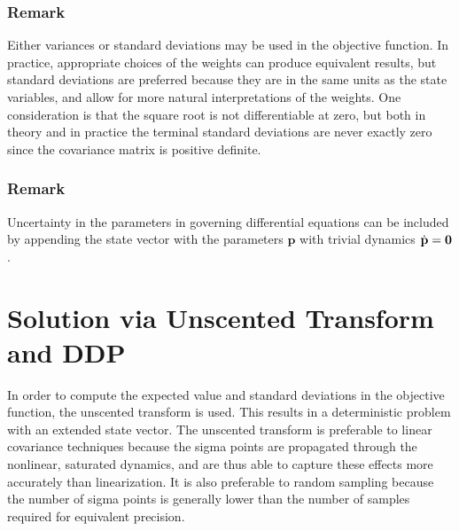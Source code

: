 \documentclass[journal ]{new-aiaa}
\newcommand{\state}{\ensuremath{\mathbf{x}}}
\newcommand{\ur}{\ensuremath{u_{\mathrm{ref}}}}
\newcommand{\param}{\ensuremath{\mathbf{p}}}
\newcommand{\E}[1]{\mathbb{E}\left[#1\right]}
\newcommand{\V}[1]{\mathbb{V}[#1]}
\newcommand{\cov}{C}
\begin{document}
\subsubsection*{Remark} Either variances or standard deviations may be used in the objective function. In practice, appropriate choices of the weights can produce equivalent results, but standard deviations are preferred because they are in the same units as the state variables, and allow for more natural interpretations of the weights. One consideration is that the square root is not differentiable at zero, but both in theory and in practice the terminal standard deviations are never exactly zero since the covariance matrix is positive definite.
\subsubsection*{Remark} Uncertainty in the parameters in governing differential equations can be included by appending the state vector with the parameters $\param$ with trivial dynamics $\dot{\param}=\bf0$.


\section*{Solution via Unscented Transform and DDP}
In order to compute the expected value and standard deviations in the objective function, the unscented transform \cite{UT1997} is used. This results in a deterministic problem with an extended state vector. The unscented transform is preferable to linear covariance techniques because the sigma points are propagated through the nonlinear, saturated dynamics, and are thus able to capture these effects more accurately than linearization. It is also preferable to random sampling because the number of sigma points is generally lower than the number of samples required for equivalent precision. %
\end{document}
